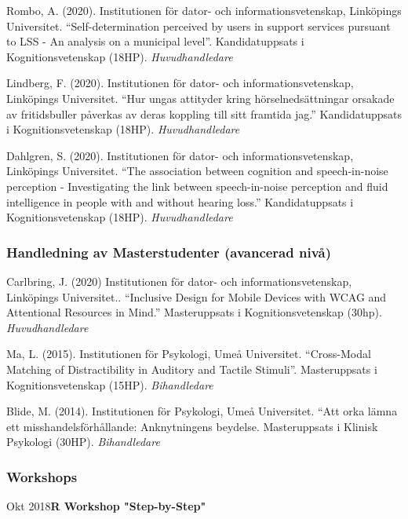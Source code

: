 \documentclass[]{article}
\begin{document}
Rombo, A. (2020). Institutionen för dator- och informationsvetenskap,
Linköpings Universitet. ``Self-determination perceived by users in
support services pursuant to LSS - An analysis on a municipal level''.
Kandidatuppsats i Kognitionsvetenskap (18HP). \emph{Huvudhandledare}

Lindberg, F. (2020). Institutionen för dator- och informationsvetenskap,
Linköpings Universitet. ``Hur ungas attityder kring hörselnedsättningar
orsakade av fritidsbuller påverkas av deras koppling till sitt framtida
jag.'' Kandidatuppsats i Kognitionsvetenskap (18HP).
\emph{Huvudhandledare}

Dahlgren, S. (2020). Institutionen för dator- och informationsvetenskap,
Linköpings Universitet. ``The association between cognition and
speech-in-noise perception - Investigating the link between
speech-in-noise perception and fluid intelligence in people with and
without hearing loss.'' Kandidatuppsats i Kognitionsvetenskap (18HP).
\emph{Huvudhandledare}

\hypertarget{handledning-av-masterstudenter-avancerad-nivuxe5}{%
\subsubsection{Handledning av Masterstudenter (avancerad
nivå)}\label{handledning-av-masterstudenter-avancerad-nivuxe5}}

Carlbring, J. (2020) Institutionen för dator- och informationsvetenskap,
Linköpings Universitet.. ``Inclusive Design for Mobile Devices with WCAG
and Attentional Resources in Mind.'' Masteruppsats i Kognitionsvetenskap
(30hp). \emph{Huvudhandledare}

Ma, L. (2015). Institutionen för Psykologi, Umeå Universitet.
``Cross-Modal Matching of Distractibility in Auditory and Tactile
Stimuli''. Masteruppsats i Kognitionsvetenskap (15HP).
\emph{Bihandledare}

Blide, M. (2014). Institutionen för Psykologi, Umeå Universitet. ``Att
orka lämna ett misshandelsförhållande: Anknytningens beydelse.
Masteruppsats i Klinisk Psykologi (30HP). \emph{Bihandledare}

\hypertarget{workshops}{%
\subsubsection{Workshops}\label{workshops}}

Okt 2018\hspace{0.75cm}\textbf{R Workshop "Step-by-Step"}\vspace{1mm}
\end{document}
